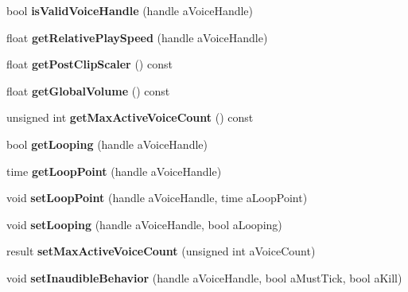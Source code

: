 \begin{DoxyCompactItemize}
bool {\bfseries is\+Valid\+Voice\+Handle} (handle a\+Voice\+Handle)
\item 
\mbox{\label{class_so_loud_1_1_soloud_a648e056e53c2b191394408d61d3c72e4}} 
float {\bfseries get\+Relative\+Play\+Speed} (handle a\+Voice\+Handle)
\item 
\mbox{\label{class_so_loud_1_1_soloud_a5a9ae5c588a41b7c88056ed160969866}} 
float {\bfseries get\+Post\+Clip\+Scaler} () const
\item 
\mbox{\label{class_so_loud_1_1_soloud_ae3d3f2e14082b41d5160c0d291d0bb79}} 
float {\bfseries get\+Global\+Volume} () const
\item 
\mbox{\label{class_so_loud_1_1_soloud_a564c5101270995c1410016b8d53a982a}} 
unsigned int {\bfseries get\+Max\+Active\+Voice\+Count} () const
\item 
\mbox{\label{class_so_loud_1_1_soloud_a0d28a9886c1d1dc7389ad12fe893d8ed}} 
bool {\bfseries get\+Looping} (handle a\+Voice\+Handle)
\item 
\mbox{\label{class_so_loud_1_1_soloud_a10a79fdadb4bdc90c909ebe1c13c8e31}} 
time {\bfseries get\+Loop\+Point} (handle a\+Voice\+Handle)
\item 
\mbox{\label{class_so_loud_1_1_soloud_ae9ba34c40e7c94c48fe313272cdb2a02}} 
void {\bfseries set\+Loop\+Point} (handle a\+Voice\+Handle, time a\+Loop\+Point)
\item 
\mbox{\label{class_so_loud_1_1_soloud_aabf12bbd4289f96ca0b80ab5f36561d1}} 
void {\bfseries set\+Looping} (handle a\+Voice\+Handle, bool a\+Looping)
\item 
\mbox{\label{class_so_loud_1_1_soloud_ad8249efec6260ec8fabdce1202255cca}} 
result {\bfseries set\+Max\+Active\+Voice\+Count} (unsigned int a\+Voice\+Count)
\item 
\mbox{\label{class_so_loud_1_1_soloud_a637327d28bfba8c649cd1055b1b589b1}} 
void {\bfseries set\+Inaudible\+Behavior} (handle a\+Voice\+Handle, bool a\+Must\+Tick, bool a\+Kill)

\end{DoxyCompactItemize}
